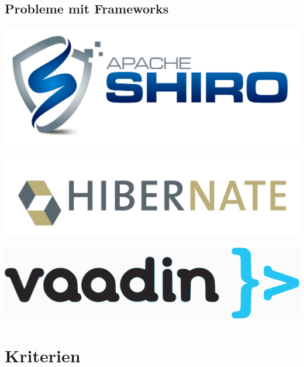 \subsection{Probleme mit Frameworks}

\begin{frame}
	\includegraphics[width=\linewidth]{images/shiro-logo.png}
\end{frame}

\begin{frame}
	\includegraphics[width=\linewidth]{images/hibernate-logo.png}
\end{frame}

\begin{frame}
	\includegraphics[width=\linewidth]{images/vaadin-logo.png}
\end{frame}



\section{Kriterien}

